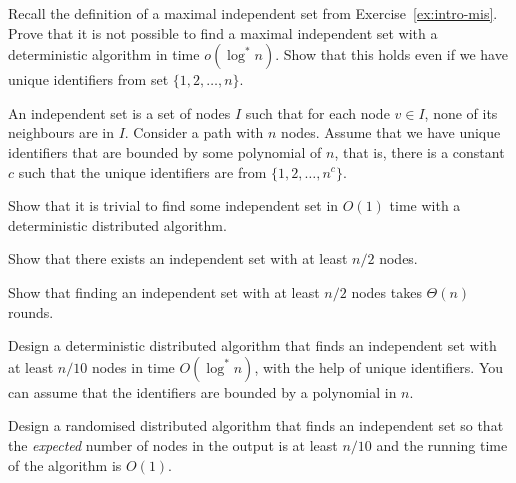\begin{ex}
    Recall the definition of a maximal independent set from Exercise~\ref{ex:intro-mis}. Prove that it is not possible to find a maximal independent set with a deterministic algorithm in time $o(\log^* n)$. Show that this holds even if we have unique identifiers from set $\{1,2,\dotsc,n\}$.
\end{ex}

\begin{ex}
    An independent set is a set of nodes $I$ such that for each node $v \in I$, none of its neighbours are in $I$. Consider a path with $n$ nodes. Assume that we have unique identifiers that are bounded by some polynomial of $n$, that is, there is a constant $c$ such that the unique identifiers are from $\{1,2,\dotsc,n^c\}$.
    \begin{subex}
        \item Show that it is trivial to find some independent set in $O(1)$ time with a deterministic distributed algorithm.
        \item Show that there exists an independent set with at least $n/2$ nodes.
        \item Show that finding an independent set with at least $n/2$ nodes takes $\Theta(n)$ rounds.
        \item Design a deterministic distributed algorithm that finds an independent set with at least $n/10$ nodes in time $O(\log^* n)$, with the help of unique identifiers. You can assume that the identifiers are bounded by a polynomial in $n$.
        \item Design a randomised distributed algorithm that finds an independent set so that the \emph{expected} number of nodes in the output is at least $n/10$ and the running time of the algorithm is $O(1)$.
    \end{subex}
\end{ex}

